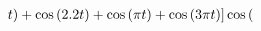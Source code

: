 \documentclass[preview]{standalone}
\begin{document}
\begin{align*}
t)}+\cos{( 2.2 t)}+\cos{( \pi t)}+\cos{( 3\pi t)}]\cos{( \quad
\end{align*}
\end{document}

